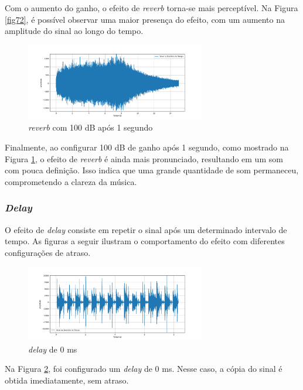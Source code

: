 Com o aumento do ganho, o efeito de \textit{reverb} torna-se mais perceptível. Na Figura \ref{fig72}, é possível observar uma maior presença do efeito, com um aumento na amplitude do sinal ao longo do tempo.

\begin{figure}[h]
    \centering
    \includegraphics[width=0.7\textwidth]{figuras/fig73.png}
    \caption{\textit{reverb} com 100 dB após 1 segundo}
    \label{fig73}
\end{figure}

Finalmente, ao configurar 100 dB de ganho após 1 segundo, como mostrado na Figura \ref{fig73}, o efeito de \textit{reverb} é ainda mais pronunciado, resultando em um som com pouca definição. Isso indica que uma grande quantidade de som permaneceu, comprometendo a clareza da música.

\subsubsection*{\textit{Delay}}

O efeito de \textit{delay} consiste em repetir o sinal após um determinado intervalo de tempo. As figuras a seguir ilustram o comportamento do efeito com diferentes configurações de atraso.

\newpage
\begin{figure}[h]
	\centering
    \includegraphics[width=0.7\textwidth]{figuras/fig74.png}
	\caption{\textit{delay} de 0 ms}
	\label{fig74}
\end{figure}

Na Figura \ref{fig74}, foi configurado um \textit{delay} de 0 ms. Nesse caso, a cópia do sinal é obtida imediatamente, sem atraso.

